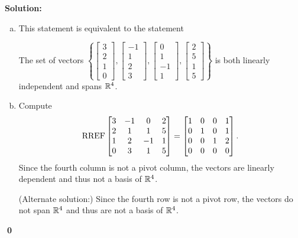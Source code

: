 \documentclass{article}
\newenvironment{solution}
{
  \ignorespaces
  \textbf{Solution:}
}
{
  \ignorespacesafterend
  \begin{flushright}
  {\bfseries \qed}
  \end{flushright}
}
\begin{document}
\begin{solution}
\begin{enumerate}[(a)]
\item This statement is equivalent to the statement
\begin{center}\begin{minipage}{0.8\textwidth}
The set of vectors \( \left\{
 \begin{bmatrix} 3 \\ 2 \\ 1 \\ 0 \end{bmatrix} ,
 \begin{bmatrix} -1 \\ 1 \\ 2 \\ 3 \end{bmatrix} ,
 \begin{bmatrix} 0 \\ 1 \\ -1 \\ 1 \end{bmatrix} ,
 \begin{bmatrix} 2 \\ 5 \\ 1 \\ 5 \end{bmatrix} \right\} \)
is both linearly independent and spans \(\mathbb{R}^4\).
\end{minipage}\end{center}
\item
Compute
\[\operatorname{RREF} \begin{bmatrix} 3 & -1 & 0 & 2 \\ 2 & 1 & 1 & 5 \\ 1 & 2 & -1 & 1 \\ 0 & 3 & 1 & 5 \end{bmatrix} =
\begin{bmatrix} 1 & 0 & 0 & 1 \\ 0 & 1 & 0 & 1 \\ 0 & 0 & 1 & 2 \\ 0 & 0 & 0 & 0 \end{bmatrix}.\]
Since the fourth column is not a pivot column, the vectors are linearly
dependent and thus not a basis of \(\mathbb{R}^4\).

(Alternate solution:)
Since the fourth row is not a pivot row, the vectors do not span
\(\mathbb{R}^4\) and thus are not a basis of \(\mathbb{R}^4\).
\end{enumerate}
\end{solution}
\end{document}
